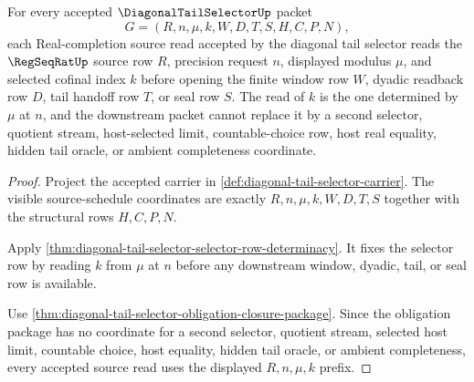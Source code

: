 \begin{theorem}
\label{thm:diagonal-tail-selector-source-schedule-readback}
For every accepted $\DiagonalTailSelectorUp$ packet
$$
G=(R,n,\mu,k,W,D,T,S,H,C,P,N),
$$
each Real-completion source read accepted by the diagonal tail selector reads
the $\RegSeqRatUp$ source row $R$, precision request $n$, displayed modulus
$\mu$, and selected cofinal index $k$ before opening the finite window row
$W$, dyadic readback row $D$, tail handoff row $T$, or seal row $S$. The read
of $k$ is the one determined by $\mu$ at $n$, and the downstream packet cannot
replace it by a second selector, quotient stream, host-selected limit,
countable-choice row, host real equality, hidden tail oracle, or ambient
completeness coordinate.
\end{theorem}
\begin{proof}
Project the accepted carrier in
\autoref{def:diagonal-tail-selector-carrier}. The visible source-schedule
coordinates are exactly $R,n,\mu,k,W,D,T,S$ together with the structural rows
$H,C,P,N$.

Apply \autoref{thm:diagonal-tail-selector-selector-row-determinacy}. It fixes
the selector row by reading $k$ from $\mu$ at $n$ before any downstream
window, dyadic, tail, or seal row is available.

Use \autoref{thm:diagonal-tail-selector-obligation-closure-package}. Since
the obligation package has no coordinate for a second selector, quotient
stream, selected host limit, countable choice, host equality, hidden tail
oracle, or ambient completeness, every accepted source read uses the displayed
$R,n,\mu,k$ prefix.
\end{proof}

